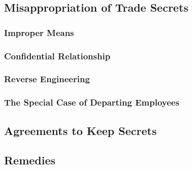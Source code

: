 
\subsection{Misappropriation of Trade Secrets}

\subsubsection{Improper Means}


\subsubsection{Confidential Relationship}


\subsubsection{Reverse Engineering}


\subsubsection{The Special Case of Departing Employees}


\subsection{Agreements to Keep Secrets}


\subsection{Remedies}

